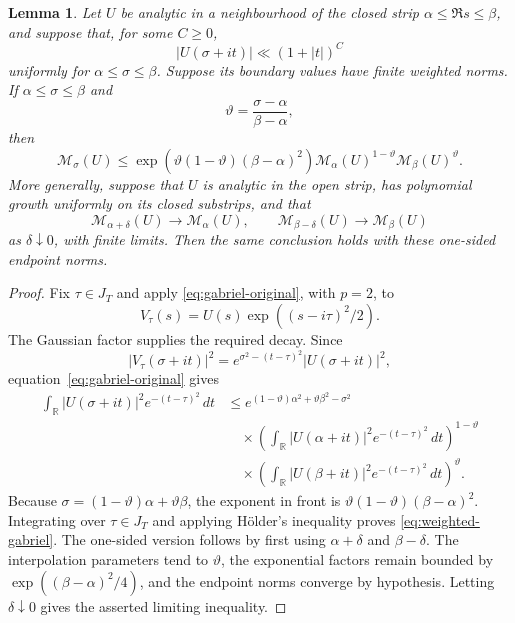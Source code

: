 \documentclass[11pt]{amsart}
\numberwithin{equation}{section}
\theoremstyle{plain}
\newtheorem{lem}{Lemma}[section]
\newcommand{\R}{\mathbb{R}}
\renewcommand{\le}{\leqslant}
\renewcommand{\ge}{\geqslant}
\begin{document}
\begin{lem}\label{lem:weighted-gabriel}
Let $U$ be analytic in a neighbourhood of the closed strip
$\alpha\le\Re s\le\beta$, and suppose that, for some $C\ge0$,
\begin{equation*}
|U(\sigma+it)|\ll(1+|t|)^C
\end{equation*}
uniformly for $\alpha\le\sigma\le\beta$.  Suppose its boundary values have
finite weighted norms.  If
$\alpha\le\sigma\le\beta$ and
\begin{equation*}
\vartheta=\frac{\sigma-\alpha}{\beta-\alpha},
\end{equation*}
then
\begin{equation}\label{eq:weighted-gabriel}
\mathcal M_\sigma(U)
\le \exp\!\left(\vartheta(1-\vartheta)(\beta-\alpha)^2\right)
\mathcal M_\alpha(U)^{1-\vartheta}
\mathcal M_\beta(U)^{\vartheta}.
\end{equation}
More generally, suppose that $U$ is analytic in the open strip, has
polynomial growth uniformly on its closed substrips, and that
\begin{equation*}
\mathcal M_{\alpha+\delta}(U)\longrightarrow\mathcal M_\alpha(U),
\qquad
\mathcal M_{\beta-\delta}(U)\longrightarrow\mathcal M_\beta(U)
\end{equation*}
as $\delta\downarrow0$, with finite limits.  Then the same conclusion
holds with these one-sided endpoint norms.
\end{lem}

\begin{proof}
Fix $\tau\in J_T$ and apply \eqref{eq:gabriel-original}, with $p=2$, to
\begin{equation*}
V_\tau(s)=U(s)\exp((s-i\tau)^2/2).
\end{equation*}
The Gaussian factor supplies the required decay.  Since
\begin{equation*}
|V_\tau(\sigma+it)|^2
=e^{\sigma^2-(t-\tau)^2}|U(\sigma+it)|^2,
\end{equation*}
equation~\eqref{eq:gabriel-original} gives
\begin{align*}
\int_{\R}|U(\sigma+it)|^2e^{-(t-\tau)^2}\,dt
&\le e^{(1-\vartheta)\alpha^2+\vartheta\beta^2-\sigma^2}\\
&\quad\times
\left(\int_{\R}|U(\alpha+it)|^2e^{-(t-\tau)^2}\,dt\right)^{1-\vartheta}\\
&\quad\times
\left(\int_{\R}|U(\beta+it)|^2e^{-(t-\tau)^2}\,dt\right)^{\vartheta}.
\end{align*}
Because $\sigma=(1-\vartheta)\alpha+\vartheta\beta$, the exponent in
front is $\vartheta(1-\vartheta)(\beta-\alpha)^2$.
Integrating over $\tau\in J_T$ and applying H\"older's inequality proves
\eqref{eq:weighted-gabriel}.  The one-sided version follows by first using
$\alpha+\delta$ and $\beta-\delta$.  The interpolation parameters tend to
$\vartheta$, the exponential factors remain bounded by
$\exp((\beta-\alpha)^2/4)$, and the endpoint norms converge by hypothesis.
Letting $\delta\downarrow0$ gives the asserted limiting inequality.
\end{proof}
\end{document}
